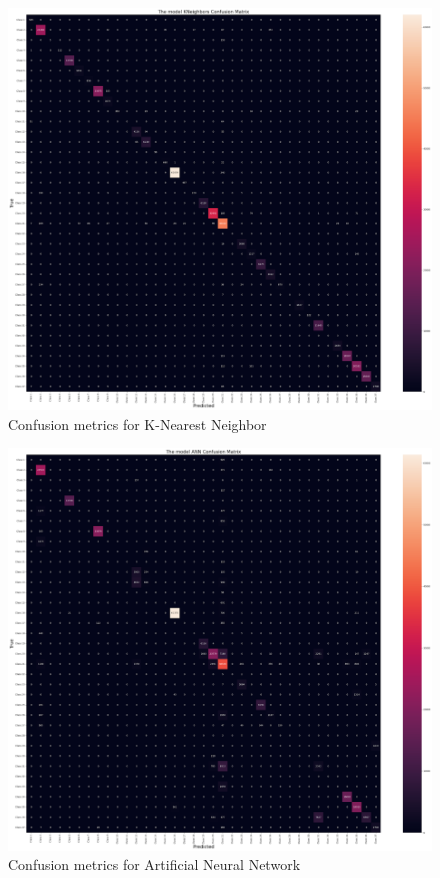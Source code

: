 \documentclass[11 pt,conference,final,]{IEEEtran}
\begin{document}
\begin{figure}

{\centering \includegraphics[width=0.8\linewidth]{img/fig13} 

}

\caption{Confusion metrics for K-Nearest Neighbor}\label{fig:unnamed-chunk-13}
\end{figure}

\begin{figure}

{\centering \includegraphics[width=0.8\linewidth]{img/ANN} 

}

\caption{Confusion metrics for Artificial Neural Network}\label{fig:unnamed-chunk-14}
\end{figure}
\end{document}
